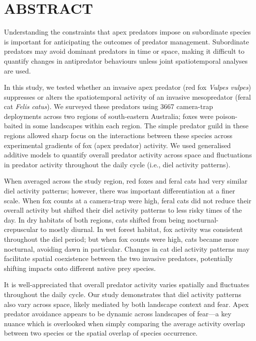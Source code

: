 \documentclass[]{elsarticle} %
\begin{document}
\linenumbers

\hypertarget{abstract}{%
\section*{ABSTRACT}\label{abstract}}

Understanding the constraints that apex predators impose on subordinate species is important for anticipating the outcomes of predator management. Subordinate predators may avoid dominant predators in time or space, making it difficult to quantify changes in antipredator behaviours unless joint spatiotemporal analyses are used.

In this study, we tested whether an invasive apex predator (red fox \emph{Vulpes vulpes}) suppresses or alters the spatiotemporal activity of an invasive mesopredator (feral cat \emph{Felis catus}). We surveyed these predators using 3667 camera-trap deployments across two regions of south-eastern Australia; foxes were poison-baited in some landscapes within each region. The simple predator guild in these regions allowed sharp focus on the interactions between these species across experimental gradients of fox (apex predator) activity. We used generalised additive models to quantify overall predator activity across space and fluctuations in predator activity throughout the daily cycle (i.e., diel activity patterns).

When averaged across the study region, red foxes and feral cats had very similar diel activity patterns; however, there was important differentiation at a finer scale. When fox counts at a camera-trap were high, feral cats did not reduce their overall activity but shifted their diel activity patterns to less risky times of the day. In dry habitats of both regions, cats shifted from being nocturnal-crepuscular to mostly diurnal. In wet forest habitat, fox activity was consistent throughout the diel period; but when fox counts were high, cats became more nocturnal, avoiding dawn in particular. Changes in cat diel activity patterns may facilitate spatial coexistence between the two invasive predators, potentially shifting impacts onto different native prey species.

It is well-appreciated that overall predator activity varies spatially and fluctuates throughout the daily cycle. Our study demonstrates that diel activity patterns also vary across space, likely mediated by both landscape context and fear. Apex predator avoidance appears to be dynamic across landscapes of fear---a key nuance which is overlooked when simply comparing the average activity overlap between two species or the spatial overlap of species occurrence.
\end{document}
